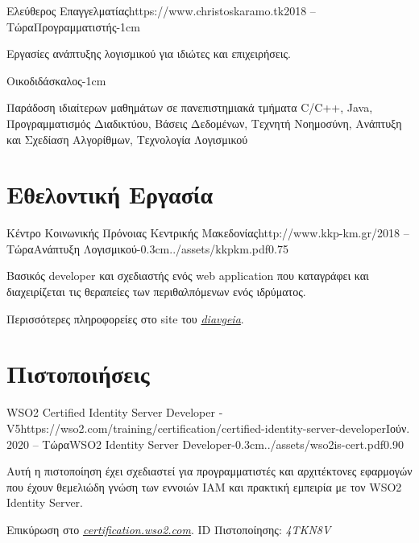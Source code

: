 \documentclass{mycv}
\begin{document}
	\begin{EntryDated}{Ελεύθερος Επαγγελματίας}{https://www.christoskaramo.tk}{2018 -- Τώρα}{Προγραμματιστής}{-1cm}
	\begin{Itemize}
		\item Εργασίες ανάπτυξης λογισμικού για ιδιώτες και επιχειρήσεις.
	\end{Itemize}
	\end{EntryDated}

	\vspace*{-1.2cm}

	\begin{EntryDated}{}{}{}{Οικοδιδάσκαλος}{-1cm}
		\begin{Itemize}
			\item Παράδοση ιδιαίτερων μαθημάτων σε πανεπιστημιακά τμήματα C/C++, Java, Προγραμματισμός Διαδικτύου, Βάσεις Δεδομένων, Τεχνητή Νοημοσύνη, Ανάπτυξη και Σχεδίαση Αλγορίθμων, Τεχνολογία Λογισμικού
		\end{Itemize}
	\end{EntryDated}
	
	\section{Εθελοντική Εργασία}
	\begin{EntryDatedLogo}{Κέντρο Κοινωνικής Πρόνοιας Κεντρικής Μακεδονίας}{http://www.kkp-km.gr/}{2018 -- Τώρα}{Ανάπτυξη Λογισμικού}{-0.3cm}{../assets/kkpkm.pdf}{0.75}
		\begin{Itemize}
			\item Βασικός developer και σχεδιαστής ενός web application που καταγράφει και διαχειρίζεται τις θεραπείες των περιθαλπόμενων ενός ιδρύματος.
			\item Περισσότερες πληροφορείες στο site του  \href{https://diavgeia.gov.gr/decision/view/\%CE\%A8\%CE\%A6\%CE\%A1\%CE\%93\%CE\%9F\%CE\%9E\%CE\%A7\%CE\%A3-\%CE\%A0\%CE\%93\%CE\%A6}{\textit{diavgeia}}.
		\end{Itemize}
	\end{EntryDatedLogo}

	\section{Πιστοποιήσεις}
	\begin{EntryDatedLogo}{WSO2 Certified Identity Server
			Developer - V5}{https://wso2.com/training/certification/certified-identity-server-developer}{Ιούν. 2020 -- Τώρα}{WSO2 Identity Server Developer}{-0.3cm}{../assets/wso2is-cert.pdf}{0.90}
		\begin{Itemize}
			\item Αυτή η πιστοποίηση έχει σχεδιαστεί για προγραμματιστές και αρχιτέκτονες εφαρμογών που έχουν θεμελιώδη γνώση των εννοιών IAM και πρακτική εμπειρία με τον WSO2 Ιdentity Server. 
			\item Επικύρωση στο \href{https://certification.wso2.com}{\textit{certification.wso2.com}}. ID Πιστοποίησης: \textit{4TKN8V}
		\end{Itemize}
	\end{EntryDatedLogo}
\end{document}
